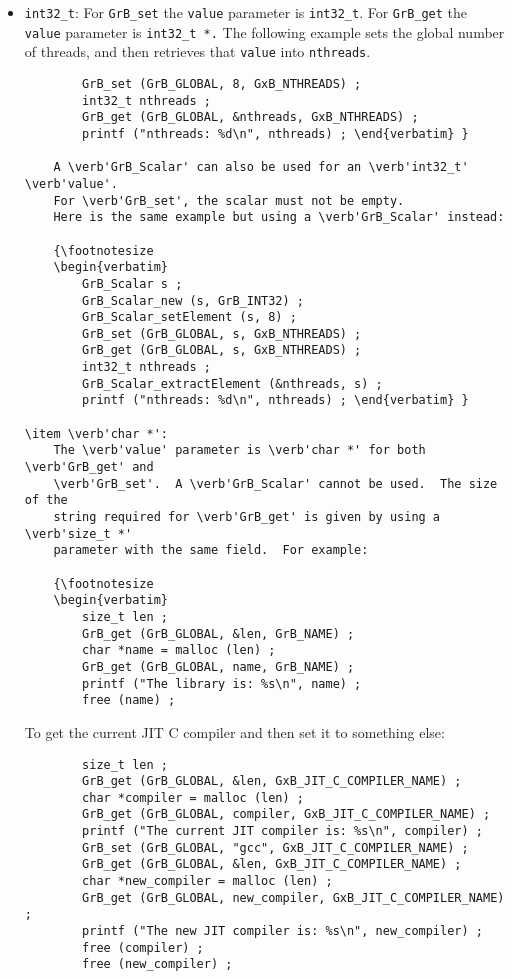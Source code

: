 \begin{itemize}
\item \verb'int32_t': 
    For \verb'GrB_set' the \verb'value' parameter is \verb'int32_t'.
    For \verb'GrB_get' the \verb'value' parameter is \verb'int32_t *.'
    The following example sets the global number of threads, and then
    retrieves that \verb'value' into \verb'nthreads'.

    {\footnotesize
    \begin{verbatim}
        GrB_set (GrB_GLOBAL, 8, GxB_NTHREADS) ;
        int32_t nthreads ;
        GrB_get (GrB_GLOBAL, &nthreads, GxB_NTHREADS) ;
        printf ("nthreads: %d\n", nthreads) ; \end{verbatim} }

    A \verb'GrB_Scalar' can also be used for an \verb'int32_t' \verb'value'.
    For \verb'GrB_set', the scalar must not be empty.
    Here is the same example but using a \verb'GrB_Scalar' instead:

    {\footnotesize
    \begin{verbatim}
        GrB_Scalar s ;
        GrB_Scalar_new (s, GrB_INT32) ;
        GrB_Scalar_setElement (s, 8) ;
        GrB_set (GrB_GLOBAL, s, GxB_NTHREADS) ;
        GrB_get (GrB_GLOBAL, s, GxB_NTHREADS) ;
        int32_t nthreads ;
        GrB_Scalar_extractElement (&nthreads, s) ;
        printf ("nthreads: %d\n", nthreads) ; \end{verbatim} }

\item \verb'char *':
    The \verb'value' parameter is \verb'char *' for both \verb'GrB_get' and
    \verb'GrB_set'.  A \verb'GrB_Scalar' cannot be used.  The size of the
    string required for \verb'GrB_get' is given by using a \verb'size_t *'
    parameter with the same field.  For example:

    {\footnotesize
    \begin{verbatim}
        size_t len ;
        GrB_get (GrB_GLOBAL, &len, GrB_NAME) ;
        char *name = malloc (len) ;
        GrB_get (GrB_GLOBAL, name, GrB_NAME) ;
        printf ("The library is: %s\n", name) ;
        free (name) ; \end{verbatim} }

    To get the current JIT C compiler and then set it to something else:

    {\footnotesize
    \begin{verbatim}
        size_t len ;
        GrB_get (GrB_GLOBAL, &len, GxB_JIT_C_COMPILER_NAME) ;
        char *compiler = malloc (len) ;
        GrB_get (GrB_GLOBAL, compiler, GxB_JIT_C_COMPILER_NAME) ;
        printf ("The current JIT compiler is: %s\n", compiler) ;
        GrB_set (GrB_GLOBAL, "gcc", GxB_JIT_C_COMPILER_NAME) ;
        GrB_get (GrB_GLOBAL, &len, GxB_JIT_C_COMPILER_NAME) ;
        char *new_compiler = malloc (len) ;
        GrB_get (GrB_GLOBAL, new_compiler, GxB_JIT_C_COMPILER_NAME) ;
        printf ("The new JIT compiler is: %s\n", new_compiler) ;
        free (compiler) ;
        free (new_compiler) ; \end{verbatim} }


\end{itemize}
